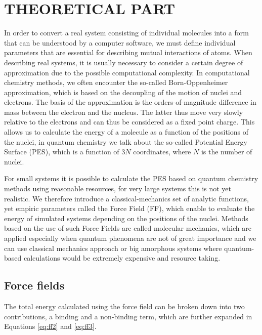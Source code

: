 \newpage
\section{THEORETICAL PART}

In order to convert a real system consisting of individual molecules into a form that can be understood by a computer software, we must define individual parameters that are essential for describing mutual interactions of atoms. When describing real systems, it is usually necessary to consider a certain degree of approximation due to the possible computational complexity. In computational chemistry methods, we often encounter the so-called Born-Oppenheimer approximation, which is based on the decoupling of the motion of nuclei and electrons. The basis of the approximation is the orders-of-magnitude difference in mass between the electron and the nucleus. The latter thus move very slowly relative to the electrons and can thus be considered as a fixed point charge. This allows us to calculate the energy of a molecule as a function of the positions of the nuclei, in quantum chemistry we talk about the so-called Potential Energy Surface (PES), which is a function of 3$N$ coordinates, where $N$ is the number of nuclei. \cite{leach_molecular_2001} 

For small systems it is possible to calculate the PES based on quantum chemistry methods using reasonable resources, for very large systems this is not yet realistic. We therefore introduce a classical-mechanics set of analytic functions, yet empiric parameters called the Force Field (FF), which enable to evaluate the energy of simulated systems depending on the positions of the nuclei. Methods based on the use of such Force Fields are called molecular mechanics, which are applied especially when quantum phenomena are not of great importance and we can use classical mechanics approach or big amorphous systems where quantum-based calculations would be extremely expensive and resource taking. \cite{monticelli_force_2013}

\subsection{Force fields}
The total energy calculated using the force field can be broken down into two contributions, a binding and a non-binding term, which are further expanded in Equations \ref{eq:ff2} and \ref{eq:ff3}.

